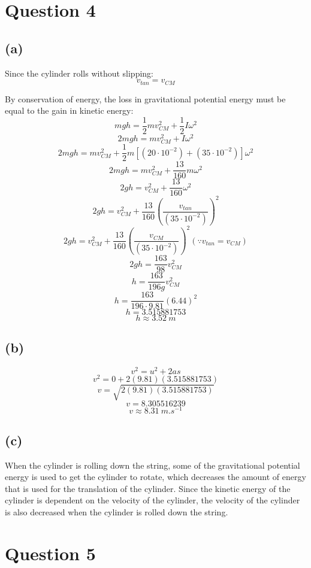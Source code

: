 \documentclass[11pt]{article}
\begin{document}
\newpage

\section{Question 4}
\label{sec:orgc936cff}

\subsection{(a)}
\label{sec:orgb373706}
Since the cylinder rolls without slipping:
\[v_{tan} = v_{CM}\]

By conservation of energy, the loss in gravitational potential energy must be equal to the gain in kinetic energy:
\[mgh = \frac{1}{2}mv_{CM}^2 + \frac{1}{2}I \omega^2\]
\[2mgh = mv_{CM}^2 + I \omega^2\]
\[2mgh = mv_{CM}^2 + \frac{1}{2} m \left[(20 \cdot 10^{-2}) + (35 \cdot 10^{-2}) \right] \omega^2\]
\[2mgh = mv_{CM}^2 + \frac{13}{160} m \omega^2\]
\[2gh = v_{CM}^2 + \frac{13}{160} \omega^2\]
\[2gh = v_{CM}^2 + \frac{13}{160} \left( \frac{v_{tan}}{(35 \cdot 10^{-2})} \right)^2\]
\[2gh = v_{CM}^2 + \frac{13}{160} \left( \frac{v_{CM}}{(35 \cdot 10^{-2})} \right)^2 (\because v_{tan} = v_{CM})\]
\[2gh = \frac{163}{98}v_{CM}^2 \]
\[h = \frac{163}{196g}v_{CM}^2 \]
\[h = \frac{163}{196 \cdot 9.81} (6.44)^2 \]
\[h = 3.515881753\]
\[h \approx \qty{3.52}{\unit{m}}\]

\subsection{(b)}
\label{sec:orge9f1970}
\[v^2 = u^2 + 2as\]
\[v^2 = 0 + 2(9.81)(3.515881753)\]
\[v = \sqrt{2(9.81)(3.515881753)}\]
\[v = 8.305516239\]
\[v \approx \qty{8.31}{\unit{m.s^{-1}}}\]

\subsection{(c)}
\label{sec:org943cabe}
When the cylinder is rolling down the string, some of the gravitational potential energy is used to get the cylinder to rotate, which decreases the amount of energy that is used for the translation of the cylinder. Since the kinetic energy of the cylinder is dependent on the velocity of the cylinder, the velocity of the cylinder is also decreased when the cylinder is rolled down the string.


\section{Question 5}
\label{sec:org6ba8e78}
\end{document}
